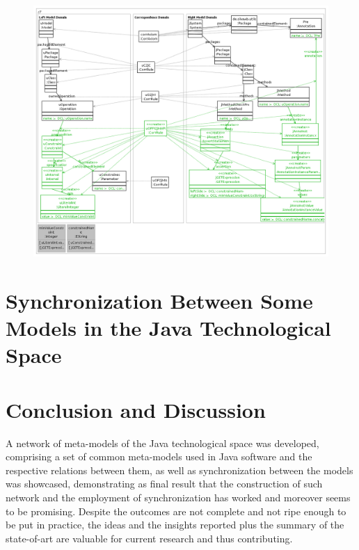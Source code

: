 \documentclass[tuberlin,cic,tc,english,noabntcite]{iiufrgs}
\begin{document}
\begin{figure}[h]
    \caption{}
    \begin{center}
        \includegraphics[width=40em]{uOPPreInt2jMAPreAssert}
    \end{center}
    \label{fig:uOPPreInt2jMAPreAssert}
\end{figure}

\chapter{Synchronization Between Some Models in the Java Technological Space}
\label{chapter:metamodel_synchronization}


\chapter{Conclusion and Discussion}
A network of meta-models of the Java technological space was developed, comprising a set of common meta-models used in Java software and the respective relations between them, as well as synchronization between the models was showcased, demonstrating as final result that the construction of such network and the employment of synchronization has worked and moreover seems to be promising. Despite the outcomes are not complete and not ripe enough to be put in practice, the ideas and the insights reported plus the summary of the state-of-art are valuable for current research and thus contributing.
\end{document}
